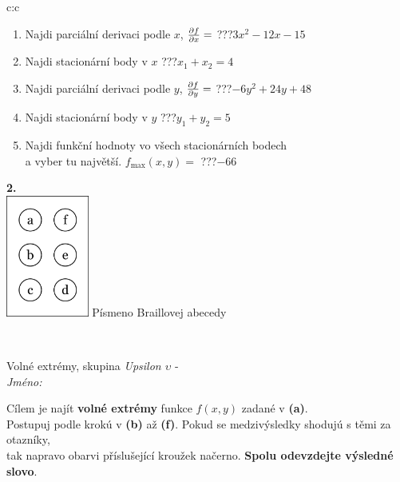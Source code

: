 \documentclass[10pt]{report}
\begin{document}
\begin{tabular}{c:c}
\begin{minipage}[c][104.5mm][t]{0.5\linewidth}
\begin{center}
\begin{minipage}{0.79\linewidth}
\begin{center}
\begin{varwidth}{\linewidth}
\begin{enumerate}
\item Najdi parciální derivaci podle $x$, $\pdv{f}{x}=$\quad \dotfill\; ???\;\dotfill \quad $3x^2-12x-15$
\item Najdi stacionární body v $x$\quad \dotfill\; ???\;\dotfill \quad $x_1+x_2=4$
\item Najdi parciální derivaci podle $y$, $\pdv{f}{y}=$\quad \dotfill\; ???\;\dotfill \quad $-6y^2+24y+48$
\item Najdi stacionární body v $y$\quad \dotfill\; ???\;\dotfill \quad $y_1+y_2=5$
\item Najdi funkční hodnoty vo všech stacionárních bodech \\ \phantom{xxxxxx} a vyber tu najvětší. $f_{\text{max}}(x,y)=$\quad \dotfill\; ???\;\dotfill \quad $-66$
\end{enumerate}
\end{varwidth}
\end{center}
\end{minipage}
\begin{minipage}{0.20\linewidth}
\begin{center}
{\Huge\bfseries 2.} \\[2mm]
\includegraphics[height=40mm]{../images/braille.png}
{\small Písmeno Braillovej abecedy}
\end{center}
\end{minipage}
\end{center}
\end{minipage}
\\ \hdashline
\begin{minipage}[c][104.5mm][t]{0.5\linewidth}
\begin{center}
\vspace{7mm}
{\huge Volné extrémy, skupina \textit{Upsilon $\upsilon$} -}\\[5mm]
\textit{Jméno:}\phantom{xxxxxxxxxxxxxxxxxxxxxxxxxxxxxxxxxxxxxxxxxxxxxxxxxxxxxxxxxxxxxxxxx}\\[5mm]
\begin{minipage}{0.95\linewidth}
\begin{center}
Cílem je najít \textbf{volné extrémy} funkce $f(x,y)$ zadané v \textbf{(a)}.\\Postupuj podle krokú v \textbf{(b)} až \textbf{(f)}. Pokud se medzivýsledky shodujú s těmi za otazníky,\\tak napravo obarvi příslušející kroužek načerno. \textbf{Spolu odevzdejte výsledné slovo}.

\end{center}
\end{minipage}
\end{center}
\end{minipage}
\end{tabular}
\end{document}

